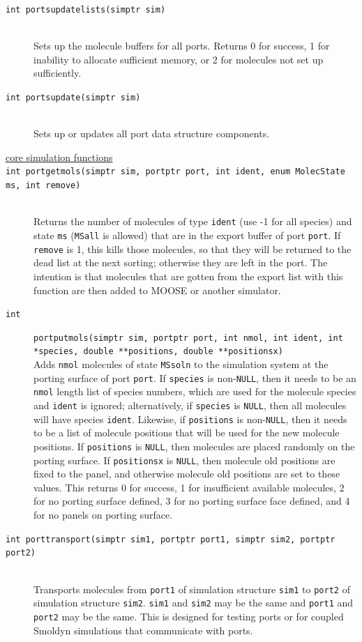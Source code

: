 \documentclass {scrbook}
\newcommand {\ttt} {\texttt}
\begin{document}
\begin{description}
\item[\ttt{int portsupdatelists(simptr sim)}]
\hfill \\
Sets up the molecule buffers for all ports. Returns 0 for success, 1 for inability to allocate sufficient memory, or 2 for molecules not set up sufficiently.

\item[\ttt{int portsupdate(simptr sim)}]
\hfill \\
Sets up or updates all port data structure components.

\item[\underline{core simulation functions}]

\item[\ttt{int portgetmols(simptr sim, portptr port, int ident, enum MolecState ms, int remove)}]
\hfill \\
Returns the number of molecules of type \ttt{ident} (use -1 for all species) and state \ttt{ms} (\ttt{MSall} is allowed) that are in the export buffer of port \ttt{port}. If \ttt{remove} is 1, this kills those molecules, so that they will be returned to the dead list at the next sorting; otherwise they are left in the port. The intention is that molecules that are gotten from the export list with this function are then added to MOOSE or another simulator.

\item[\ttt{int}]
\ttt{portputmols(simptr sim, portptr port, int nmol, int ident, int *species, double **positions, double **positionsx)}
\hfill \\
Adds \ttt{nmol} molecules of state \ttt{MSsoln} to the simulation system at the porting surface of port \ttt{port}. If \ttt{species} is non-\ttt{NULL}, then it needs to be an \ttt{nmol} length list of species numbers, which are used for the molecule species and \ttt{ident} is ignored; alternatively, if \ttt{species} is \ttt{NULL}, then all molecules will have species \ttt{ident}. Likewise, if \ttt{positions} is non-\ttt{NULL}, then it needs to be a list of molecule positions that will be used for the new molecule positions. If \ttt{positions} is \ttt{NULL}, then molecules are placed randomly on the porting surface. If \ttt{positionsx} is \ttt{NULL}, then molecule old positions are fixed to the panel, and otherwise molecule old positions are set to these values. This returns 0 for success, 1 for insufficient available molecules, 2 for no porting surface defined, 3 for no porting surface face defined, and 4 for no panels on porting surface.

\item[\ttt{int porttransport(simptr sim1, portptr port1, simptr sim2, portptr port2)}]
\hfill \\
Transports molecules from \ttt{port1} of simulation structure \ttt{sim1} to \ttt{port2} of simulation structure \ttt{sim2}. \ttt{sim1} and \ttt{sim2} may be the same and \ttt{port1} and \ttt{port2} may be the same. This is designed for testing ports or for coupled Smoldyn simulations that communicate with ports.

\end{description}
\end{document}
